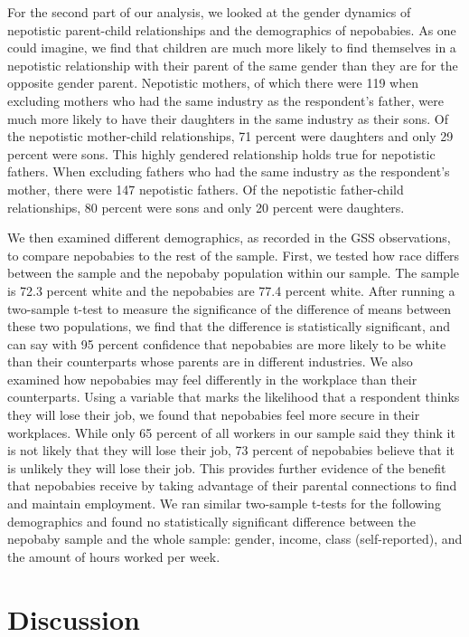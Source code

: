 \documentclass[12pt]{article}
\begin{document}
For the second part of our analysis, we looked at the gender dynamics of nepotistic parent-child relationships and the demographics of nepobabies. As one could imagine, we find that children are much more likely to find themselves in a nepotistic relationship with their parent of the same gender than they are for the opposite gender parent. Nepotistic mothers, of which there were 119 when excluding mothers who had the same industry as the respondent’s father, were much more likely to have their daughters in the same industry as their sons. Of the nepotistic mother-child relationships, 71 percent were daughters and only 29 percent were sons. This highly gendered relationship holds true for nepotistic fathers. When excluding fathers who had the same industry as the respondent’s mother, there were 147 nepotistic fathers. Of the nepotistic father-child relationships, 80 percent were sons and only 20 percent were daughters. 


We then examined different demographics, as recorded in the GSS observations, to compare nepobabies to the rest of the sample. First, we tested how race differs between the sample and the nepobaby population within our sample. The sample is 72.3 percent white and the nepobabies are 77.4 percent white. After running a two-sample t-test to measure the significance of the difference of means between these two populations, we find that the difference is statistically significant, and can say with 95 percent confidence that nepobabies are more likely to be white than their counterparts whose parents are in different industries. We also examined how nepobabies may feel differently in the workplace than their counterparts. Using a variable that marks the likelihood that a respondent thinks they will lose their job, we found that nepobabies feel more secure in their workplaces. While only 65 percent of all workers in our sample said they think it is not likely that they will lose their job, 73 percent of nepobabies believe that it is unlikely they will lose their job. This provides further evidence of the benefit that nepobabies receive by taking advantage of their parental connections to find and maintain employment.
We ran similar two-sample t-tests for the following demographics and found no statistically significant difference between the nepobaby sample and the whole sample: gender, income, class (self-reported), and the amount of hours worked per week. 
 


\iffalse
\section{Discussion}
\label{sec:discussion}
\end{document}
